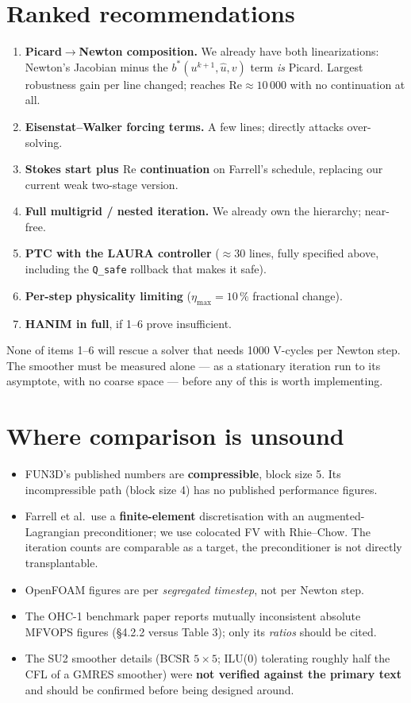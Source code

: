 \documentclass[11pt,a4paper]{article}
\newcommand{\code}[1]{\texttt{\small #1}}
\newcommand{\Rey}{\mathrm{Re}}
\begin{document}
\section{Ranked recommendations}
\begin{enumerate}[leftmargin=*]
\item \textbf{Picard$\to$Newton composition.} We already have both linearizations: Newton's
Jacobian minus the $b^*(u^{k+1},\hat u,v)$ term \emph{is} Picard. Largest robustness gain per
line changed; reaches $\Rey\approx10\,000$ with no continuation at all.
\item \textbf{Eisenstat--Walker forcing terms.} A few lines; directly attacks over-solving.
\item \textbf{Stokes start plus $\Rey$ continuation} on Farrell's schedule, replacing our
current weak two-stage version.
\item \textbf{Full multigrid / nested iteration.} We already own the hierarchy; near-free.
\item \textbf{PTC with the LAURA controller} ($\approx$30 lines, fully specified above,
including the \code{Q\_safe} rollback that makes it safe).
\item \textbf{Per-step physicality limiting} ($\eta_{\max} = 10\,\%$ fractional change).
\item \textbf{HANIM in full}, if 1--6 prove insufficient.
\end{enumerate}

\begin{tcolorbox}[colback=orange!6,colframe=orange!60!black,title=\bfseries Caveat on the ordering]
None of items 1--6 will rescue a solver that needs 1000 V-cycles per Newton step. The
smoother must be measured alone --- as a stationary iteration run to its asymptote, with no
coarse space --- before any of this is worth implementing.
\end{tcolorbox}

\section{Where comparison is unsound}
\begin{itemize}[leftmargin=*]
\item FUN3D's published numbers are \textbf{compressible}, block size 5. Its incompressible
path (block size 4) has no published performance figures.
\item Farrell et al.\ use a \textbf{finite-element} discretisation with an augmented-Lagrangian
preconditioner; we use colocated FV with Rhie--Chow. The iteration counts are comparable as a
target, the preconditioner is not directly transplantable.
\item OpenFOAM figures are per \emph{segregated timestep}, not per Newton step.
\item The OHC-1 benchmark paper reports mutually inconsistent absolute MFVOPS figures
(\S4.2.2 versus Table 3); only its \emph{ratios} should be cited.
\item The SU2 smoother details (BCSR $5\times5$; ILU(0) tolerating roughly half the CFL of a
GMRES smoother) were \textbf{not verified against the primary text} and should be confirmed
before being designed around.
\end{itemize}
\end{document}
